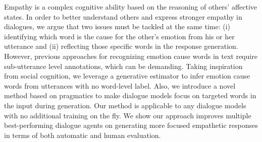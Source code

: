 Empathy is a complex cognitive ability based on the reasoning of others' affective states. In order to better understand others and express stronger empathy in dialogues, we argue that two issues must be tackled at the same time: (i) identifying which word is the cause for the other's emotion from his or her utterance and (ii) reflecting those specific words in the response generation. However, previous approaches for recognizing emotion cause words in text require sub-utterance level annotations, which can be demanding. Taking inspiration from social cognition, we leverage a generative estimator to infer emotion cause words from utterances with no word-level label. Also, we introduce a novel method based on pragmatics to make dialogue models focus on targeted words in the input during generation. Our method is applicable to any dialogue models with no additional training on the fly. We show our approach improves multiple best-performing dialogue agents on generating more focused empathetic responses in terms of both automatic and human evaluation.
